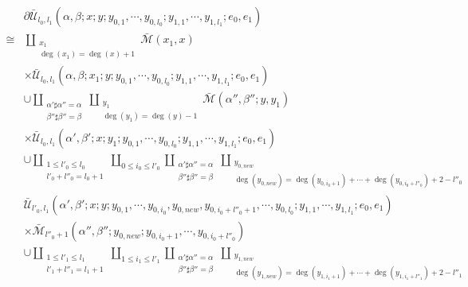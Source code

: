 \documentclass{amsart}
\numberwithin{equation}{section}
\numberwithin{figure}{section}
\begin{document}
\begin{equation}\label{boundary strata of the moduli space of quilted maps defining a different realization of the cochain map}
\begin{split}
& \partial \bar{\mathcal{U}}_{l_{0}, l_{1}}(\alpha, \beta; x; y; y_{0, 1}, \cdots, y_{0, l_{0}}; y_{1, 1}, \cdots, y_{1, l_{1}}; e_{0}, e_{1})\\
\cong & \coprod_{\substack{x_{1} \\ \deg(x_{1}) = \deg(x) + 1}}
\bar{\mathcal{M}}(x_{1}, x)\\
& \times \bar{\mathcal{U}}_{l_{0}, l_{1}}(\alpha, \beta; x_{1}; y; y_{0, 1}, \cdots, y_{0, l_{0}}; y_{1, 1}, \cdots, y_{1, l_{1}}; e_{0}, e_{1})\\
& \cup \coprod_{\substack{\alpha' \sharp \alpha'' = \alpha \\ \beta'' \sharp \beta'' = \beta}} \coprod_{\substack{y_{1} \\ \deg(y_{1}) = \deg(y) - 1}}
\bar{\mathcal{M}}(\alpha'', \beta''; y, y_{1})\\
& \times \bar{\mathcal{U}}_{l_{0}, l_{1}}(\alpha', \beta'; x; y_{1}; y_{0, 1}, \cdots, y_{0, l_{0}}; y_{1, 1}, \cdots, y_{1, l_{1}}; e_{0}, e_{1})\\
& \cup \coprod_{\substack{1 \le l'_{0} \le l_{0} \\ l'_{0} + l''_{0} = l_{0} + 1}} \coprod_{0 \le i_{0} \le l'_{0}} \coprod_{\substack{\alpha' \sharp \alpha'' = \alpha \\ \beta'' \sharp \beta'' = \beta}} \coprod_{\substack{y_{0, new}\\ \deg(y_{0, new}) = \deg(y_{0, i_{0}+1}) + \cdots + \deg(y_{0, i_{0} + l''_{0}}) + 2 - l''_{0}}}\\
& \bar{\mathcal{U}}_{l'_{0}, l_{1}}(\alpha', \beta'; x; y; y_{0, 1}, \cdots, y_{0, i_{0}}, y_{0, new}, y_{0, i_{0} + l''_{0} + 1}, \cdots, y_{0, l_{0}}; y_{1, 1}, \cdots, y_{1, l_{1}}; e_{0}, e_{1})\\
& \times \bar{\mathcal{M}}_{l''_{0}+1}(\alpha'', \beta''; y_{0, new}; y_{0, i_{0} + 1}, \cdots, y_{0, i_{0} + l''_{0}})\\
& \cup \coprod_{\substack{1 \le l'_{1} \le l_{1} \\ l'_{1}+l''_{1} = l_{1} + 1}} \coprod_{1 \le i_{1} \le l'_{1}} \coprod_{\substack{\alpha' \sharp \alpha'' = \alpha \\ \beta'' \sharp \beta'' = \beta}} \coprod_{\substack{y_{1, new}\\ \deg(y_{1, new}) = \deg(y_{1, i_{1}+1}) + \cdots + \deg(y_{1, i_{1}+l''_{1}}) + 2 - l''_{1}}}\\

\end{split}
\end{equation}
\end{document}
